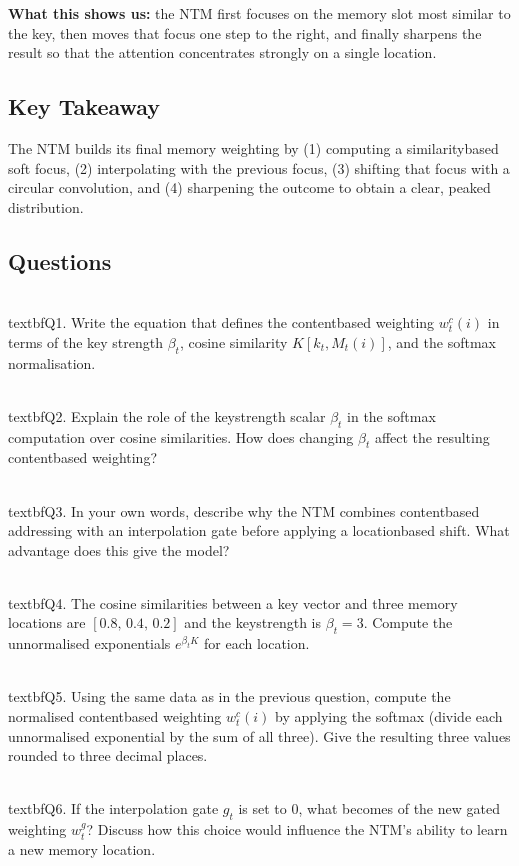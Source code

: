 \documentclass[12pt, a4paper]{article}
\begin{document}
{\textbf{What this shows us:} the NTM first focuses on the memory slot most similar to the key, then moves that focus one step to the right, and finally sharpens the result so that the attention concentrates strongly on a single location.

\subsection{Key Takeaway}
The NTM builds its final memory weighting by (1) computing a similaritybased soft focus, (2) interpolating with the previous focus, (3) shifting that focus with a circular convolution, and (4) sharpening the outcome to obtain a clear, peaked distribution.

\newpage
\subsection*{Questions}

\\textbf{Q1.} Write the equation that defines the contentbased weighting $w_t^{c}(i)$ in terms of the key strength $\beta_t$, cosine similarity $K[k_t,M_t(i)]$, and the softmax normalisation.

\\textbf{Q2.} Explain the role of the keystrength scalar $\beta_t$ in the softmax computation over cosine similarities. How does changing $\beta_t$ affect the resulting contentbased weighting?

\\textbf{Q3.} In your own words, describe why the NTM combines contentbased addressing with an interpolation gate before applying a locationbased shift. What advantage does this give the model?

\\textbf{Q4.} The cosine similarities between a key vector and three memory locations are $[0.8,\,0.4,\,0.2]$ and the keystrength is $\beta_t = 3$. Compute the unnormalised exponentials $e^{\beta_t K}$ for each location.

\\textbf{Q5.} Using the same data as in the previous question, compute the normalised contentbased weighting $w_t^{c}(i)$ by applying the softmax (divide each unnormalised exponential by the sum of all three). Give the resulting three values rounded to three decimal places.

\\textbf{Q6.} If the interpolation gate $g_t$ is set to $0$, what becomes of the new gated weighting $w_t^{g}$? Discuss how this choice would influence the NTM's ability to learn a new memory location.

}
\end{document}
